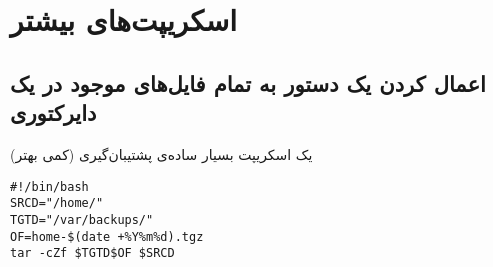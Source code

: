 \chapter{اسکریپت‌های بیشتر}
\section*{اعمال کردن یک دستور به تمام فایل‌های موجود در یک دایرکتوری}
\begin{example}{یک اسکریپت بسیار ساده‌ی پشتیبان‌گیری (کمی بهتر)}
\begin{latin}
\begin{lstlisting}
#!/bin/bash
SRCD="/home/"
TGTD="/var/backups/"
OF=home-$(date +%Y%m%d).tgz
tar -cZf $TGTD$OF $SRCD
\end{lstlisting}
\end{latin}
\end{example}

